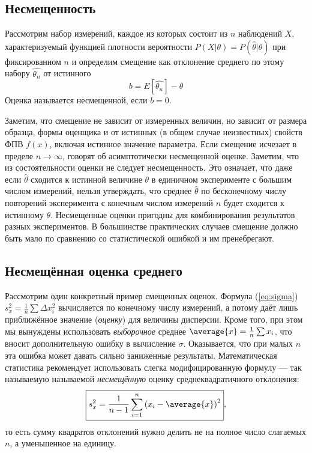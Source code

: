 \subsection{Несмещенность}

Рассмотрим набор измерений, каждое из которых состоит из $n$
наблюдений $X$, характеризуемый функцией плотности вероятности
$P(X | \theta) = P(\hat\theta | \theta)$ при фиксированном $n$ и
определим смещение как отклонение среднего по этому набору
$\hat{\theta_n}$ от истинного \begin{equation}
   b = E[\hat{\theta_n}] - \theta
\end{equation} Оценка называется несмещенной, если $b = 0$.

Заметим, что смещение не зависит от измеренных величин, но зависит от
размера образца, формы оценщика и от истинных (в общем случае
неизвестных) свойств ФПВ $f(x)$, включая истинное значение параметра.
Если смещение исчезает в пределе $n \to \infty$, говорят об
асимптотически несмещенной оценке. Заметим, что из состоятельности
оценки не следует несмещенность. Это означает, что даже если
$\hat{\theta}$ сходится к истинной величине $\theta$ в единичном
эксперименте с большим числом измерений, нельзя утверждать, что среднее
$\hat{\theta}$ по бесконечному числу повторений эксперимента с
конечным числом измерений $n$ будет сходится к истинному $\theta$.
Несмещенные оценки пригодны для комбинирования результатов разных
экспериментов. В большинстве практических случаев смещение должно быть
мало по сравнению со статистической ошибкой и им пренебрегают.

\subsection{Несмещённая оценка среднего}


Рассмотрим один конкретный пример смещенных оценок. Формула (\ref{eq:sigma}) $s_{x}^{2}=\frac{1}{n}\sum\Delta x_{i}^{2}$
вычисляется по конечному числу измерений, а потому даёт лишь приближённое
значение (\emph{оценку}) для величины дисперсии. Кроме того, при этом
мы вынуждены использовать \emph{выборочное} среднее $\average{x}=\frac{1}{n}\sum x_{i}$,
что вносит дополнительную ошибку в вычисление $\sigma$. Оказывается,
что при малых $n$ эта ошибка может давать сильно заниженные результаты.
Математическая статистика рекомендует использовать слегка модифицированную
формулу --- так называемую называемой \emph{несмещённую}
оценку среднеквадратичного отклонения:
\begin{equation}
\boxed{s_{x}^{2}=\frac{1}{n-1}\sum\limits _{i=1}^{n}\left(x_{i}-\average{x}\right)^{2}},\label{eq:sigma_straight}
\end{equation}
то есть сумму квадратов отклонений нужно делить не на полное число
слагаемых $n$, а уменьшенное на единицу.

